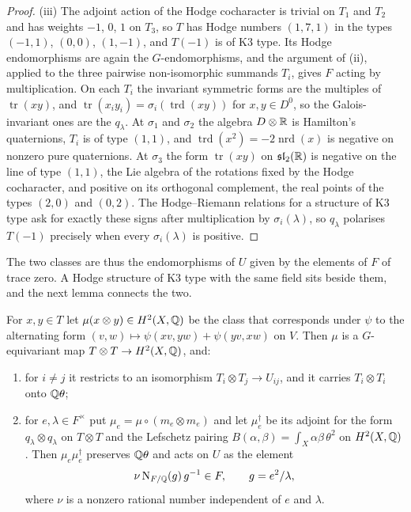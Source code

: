 \begin{proof}
(iii) The adjoint action of the Hodge cocharacter is trivial on $T_{1}$ and
$T_{2}$ and has weights $-1$, $0$, $1$ on $T_{3}$, so $T$ has Hodge numbers
$(1,7,1)$ in the types $(-1,1)$, $(0,0)$, $(1,-1)$, and $T(-1)$ is of K3
type. Its Hodge endomorphisms are again the $G$-endomorphisms, and the
argument of (ii), applied to the three pairwise non-isomorphic summands
$T_{i}$, gives $F$ acting by multiplication. On each $T_{i}$ the invariant
symmetric forms are the multiples of $\operatorname{tr}(xy)$, and
$\operatorname{tr}(x_{i}y_{i})=\sigma_{i}(\operatorname{trd}(xy))$ for
$x,y\in D^{0}$, so the Galois-invariant ones are the $q_{\lambda}$. At
$\sigma_{1}$ and $\sigma_{2}$ the algebra $D\otimes\mathbb{R}$ is Hamilton's
quaternions, $T_{i}$ is of type $(1,1)$, and
$\operatorname{trd}(x^{2})=-2\operatorname{nrd}(x)$ is negative on nonzero
pure quaternions. At $\sigma_{3}$ the form
$\operatorname{tr}(xy)$ on $\mathfrak{sl}_{2}(\mathbb{R})$ is negative on the line of
type $(1,1)$, the Lie algebra of the rotations fixed by the Hodge
cocharacter, and positive on its orthogonal complement, the real points of
the types $(2,0)$ and $(0,2)$. The Hodge--Riemann relations for a structure
of K3 type ask for exactly these signs after multiplication by
$\sigma_{i}(\lambda)$, so $q_{\lambda}$ polarises $T(-1)$ precisely when every
$\sigma_{i}(\lambda)$ is positive.
\end{proof}

The two classes are thus the endomorphisms of $U$ given by the elements of
$F$ of trace zero. A Hodge structure of K3 type with the same field sits
beside them, and the next lemma connects the two.

\begin{lemma}\label{lem:mumfordmu}
For $x,y\in T$ let $\mu(x\otimes y)\in H^{2}(X,\mathbb{Q})$ be the class that
corresponds under $\psi$ to the alternating form
$(v,w)\mapsto\psi(xv,yw)+\psi(yv,xw)$ on $V$. Then $\mu$ is a $G$-equivariant
map $T\otimes T\to H^{2}(X,\mathbb{Q})$, and:
\begin{enumerate}[label=\textup{(\roman*)},nosep,leftmargin=2.6em]
\item for $i\ne j$ it restricts to an isomorphism $T_{i}\otimes T_{j}\to
  U_{ij}$, and it carries $T_{i}\otimes T_{i}$ onto $\mathbb{Q}\theta$;
\item for $e,\lambda\in F^{\times}$ put $\mu_{e}=\mu\circ(m_{e}\otimes m_{e})$
  and let $\mu_{e}^{\dagger}$ be its adjoint for the form
  $q_{\lambda}\otimes q_{\lambda}$ on $T\otimes T$ and the Lefschetz pairing
  $B(\alpha,\beta)=\int_{X}\alpha\beta\,\theta^{2}$ on $H^{2}(X,\mathbb{Q})$. Then
  $\mu_{e}\mu_{e}^{\dagger}$ preserves $\mathbb{Q}\theta$ and acts on $U$ as the
  element
  \[
    \nu\,\mathrm{N}_{F/\mathbb{Q}}(g)\,g^{-1}\in F,\qquad g=e^{2}/\lambda,
  \]
  where $\nu$ is a nonzero rational number independent of $e$ and $\lambda$.
\end{enumerate}
\end{lemma}

